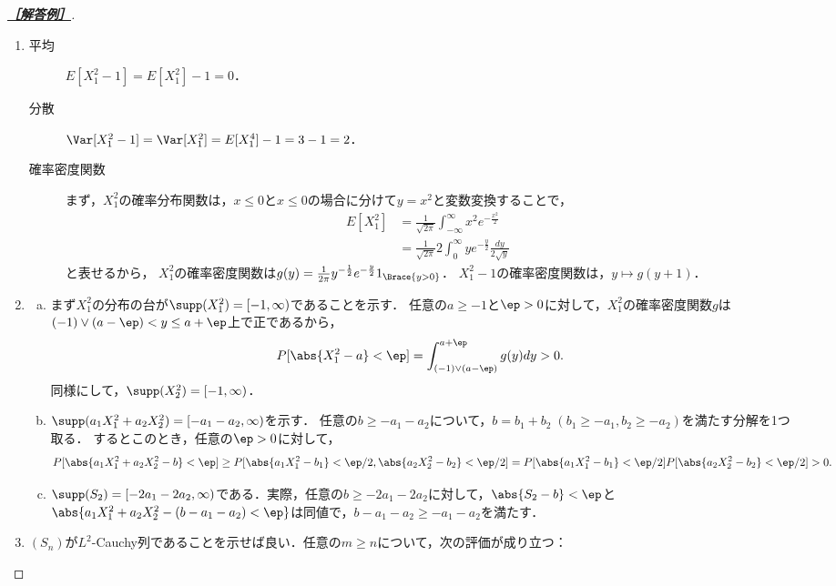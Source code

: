 \documentclass[uplatex,dvipdfmx]{jsarticle}
\begin{document}
\begin{proof}[\textbf{\underline{［解答例］}}]\mbox{}
    \begin{enumerate}
        \item \begin{description}
            \item[平均] $E[X_1^2-1]=E[X_1^2]-1=0$．
            \item[分散] $\Var[X_1^2-1]=\Var[X_1^2]=E[X_1^4]-1=3-1=2$．
            \item[確率密度関数] まず，$X_1^2$の確率分布関数は，$x\le0$と$x\le 0$の場合に分けて$y=x^2$と変数変換することで，
            \begin{align*}
                E[X_1^2]&=\frac{1}{\sqrt{2\pi}}\int^\infty_{-\infty}x^2e^{-\frac{x^2}{2}}\\
                &=\frac{1}{\sqrt{2\pi}}2\int^\infty_0ye^{-\frac{y}{2}}\frac{dy}{2\sqrt{y}}
            \end{align*}
            と表せるから，
            $X_1^2$の確率密度関数は$g(y)=\frac{1}{2\pi}y^{-\frac{1}{2}}e^{-\frac{y}{2}}1_{\Brace{y>0}}$．
            $X_1^2-1$の確率密度関数は，$y\mapsto g(y+1)$．
        \end{description}
        \item \begin{enumerate}[(a)]
            \item まず$X_1^2$の分布の台が$\supp(X_1^2)=[-1,\infty)$であることを示す．
            任意の$a\ge-1$と$\ep>0$に対して，$X_1^2$の確率密度関数$g$は$(-1)\lor(a-\ep)<y\le a+\ep$上で正であるから，
            \[P[\abs{X_1^2-a}<\ep]=\int^{a+\ep}_{(-1)\lor(a-\ep)}g(y)dy>0.\]
            同様にして，$\supp(X_2^2)=[-1,\infty)$．
            \item $\supp(a_1X_1^2+a_2X_2^2)=[-a_1-a_2,\infty)$を示す．
            任意の$b\ge-a_1-a_2$について，$b=b_1+b_2\;(b_1\ge-a_1,b_2\ge-a_2)$を満たす分解を1つ取る．
            するとこのとき，任意の$\ep>0$に対して，
            \[P[\abs{a_1X_1^2+a_2X_2^2-b}<\ep]\ge P[\abs{a_1X_1^2-b_1}<\ep/2,\abs{a_2X_2^2-b_2}<\ep/2]=P[\abs{a_1X_1^2-b_1}<\ep/2]P[\abs{a_2X_2^2-b_2}<\ep/2]>0.\]
            \item $\supp(S_2)=[-2a_1-2a_2,\infty)$である．実際，任意の$b\ge-2a_1-2a_2$に対して，$\abs{S_2-b}<\ep$と$\abs{a_1X_1^2+a_2X_2^2-(b-a_1-a_2)<\ep}$は同値で，$b-a_1-a_2\ge -a_1-a_2$を満たす．
        \end{enumerate}
        \item $(S_n)$が$L^2$-Cauchy列であることを示せば良い．任意の$m\ge n$について，次の評価が成り立つ：

\end{enumerate}
\end{proof}
\end{document}
